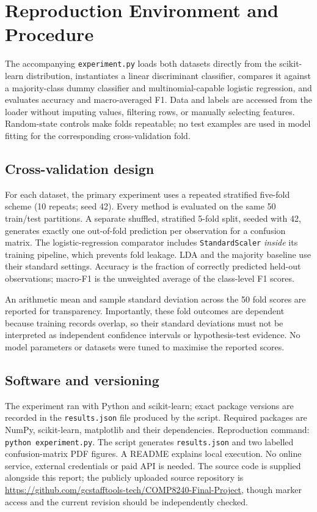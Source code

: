 \documentclass[11pt]{article}
\begin{document}
\section{Reproduction Environment and Procedure}
The accompanying \texttt{experiment.py} loads both datasets directly from the scikit-learn distribution, instantiates a linear discriminant classifier, compares it against a majority-class dummy classifier and multinomial-capable logistic regression, and evaluates accuracy and macro-averaged F1. Data and labels are accessed from the loader without imputing values, filtering rows, or manually selecting features. Random-state controls make folds repeatable; no test examples are used in model fitting for the corresponding cross-validation fold.

\subsection{Cross-validation design}
For each dataset, the primary experiment uses a repeated stratified five-fold scheme (10 repeats; seed 42). Every method is evaluated on the same 50 train/test partitions. A separate shuffled, stratified 5-fold split, seeded with 42, generates exactly one out-of-fold prediction per observation for a confusion matrix. The logistic-regression comparator includes \texttt{StandardScaler} \emph{inside} its training pipeline, which prevents fold leakage. LDA and the majority baseline use their standard settings. Accuracy is the fraction of correctly predicted held-out observations; macro-F1 is the unweighted average of the class-level F1 scores.

An arithmetic mean and sample standard deviation across the 50 fold scores are reported for transparency. Importantly, these fold outcomes are dependent because training records overlap, so their standard deviations must not be interpreted as independent confidence intervals or hypothesis-test evidence. No model parameters or datasets were tuned to maximise the reported scores.

\subsection{Software and versioning}
The experiment ran with Python and scikit-learn; exact package versions are recorded in the \texttt{results.json} file produced by the script. Required packages are NumPy, scikit-learn, matplotlib and their dependencies. Reproduction command: \texttt{python experiment.py}. The script generates \texttt{results.json} and two labelled confusion-matrix PDF figures. A README explains local execution. No online service, external credentials or paid API is needed. The source code is supplied alongside this report; the publicly uploaded source repository is \url{https://github.com/gcstafftools-tech/COMP8240-Final-Project}, though marker access and the current revision should be independently checked.
\end{document}
